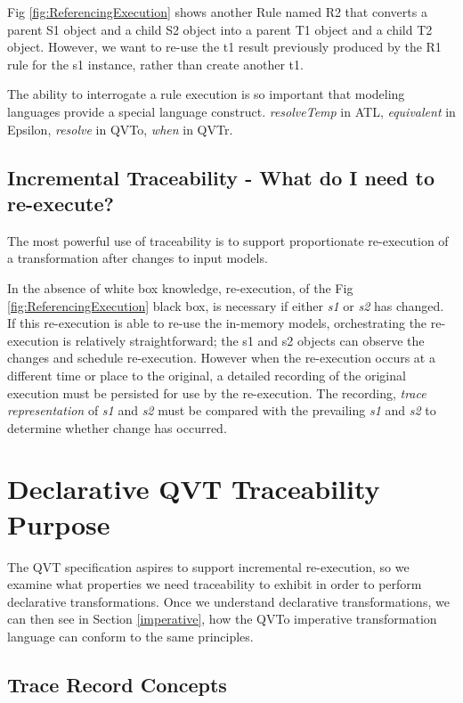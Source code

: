 \documentclass[runningheads,a4paper]{llncs}
\begin{document}
Fig \ref{fig:ReferencingExecution} shows another Rule named R2 that converts a parent S1 object and a child S2 object into a parent T1 object and a child T2 object. However, we want to re-use the t1 result previously produced by the R1 rule for the s1 instance, rather than create another t1.

The ability to interrogate a rule execution is so important that modeling languages provide a special language construct. \emph{resolveTemp} in ATL, \emph{equivalent} in Epsilon, \emph{resolve} in QVTo, \emph{when} in QVTr.

\subsection{Incremental Traceability - What do I need to re-execute?}

The most powerful use of traceability is to support proportionate re-execution of a transformation after changes to input models.

In the absence of white box knowledge, re-execution, of the Fig \ref{fig:ReferencingExecution} black box, is necessary if either \emph{s1} or \emph{s2} has changed. If this re-execution is able to re-use the in-memory models, orchestrating the re-execution is relatively straightforward; the s1 and s2 objects can observe the changes and schedule re-execution. However when the re-execution occurs at a different time or place to the original, a detailed recording of the original execution must be persisted for use by the re-execution. The recording, \emph{trace representation} of \emph{s1} and \emph{s2} must be compared with the prevailing \emph{s1} and \emph{s2} to determine whether change has occurred. 

\section{Declarative QVT Traceability Purpose}\label{axioms}

The QVT specification aspires to support incremental re-execution, so we examine what properties we need traceability to exhibit in order to perform declarative transformations. Once we understand declarative transformations, we can then see in Section \ref{imperative}, how the QVTo imperative transformation language can conform to the same principles.

\subsection{Trace Record Concepts}
\end{document}
